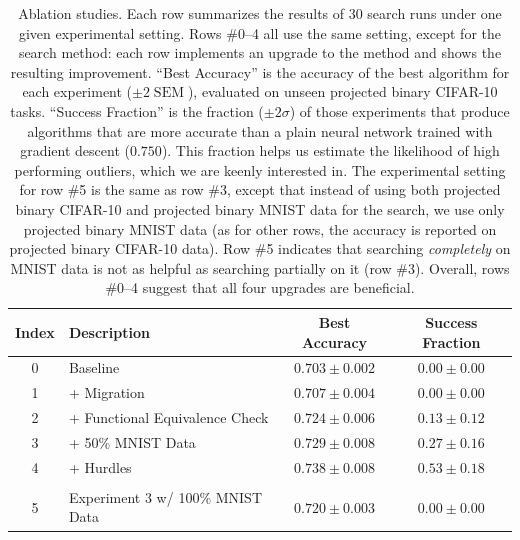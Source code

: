 {\begin{table}[!ht]
\caption{Ablation studies. Each row summarizes the results of 30 search runs under one given experimental setting. Rows \#0--4 all use the same setting, except for the search method: each row implements an upgrade to the method and shows the resulting improvement. ``Best Accuracy'' is the accuracy of the best algorithm for each experiment ($\pm 2\operatorname{SEM}$), evaluated on unseen projected binary CIFAR-10 tasks. ``Success Fraction'' is the fraction ($\pm 2\sigma$) of those experiments that produce algorithms that are more accurate than a plain neural network trained with gradient descent ($0.750$). This fraction helps us estimate the likelihood of high performing outliers, which we are keenly interested in. The experimental setting for row \#5 is the same as row \#3, except that instead of using both projected binary CIFAR-10 and projected binary MNIST data for the search, we use only projected binary MNIST data (as for other rows, the accuracy is reported on projected binary CIFAR-10 data). Row \#5 indicates that searching \emph{completely} on MNIST data is not as helpful as searching partially on it (row \#3). Overall, rows \#0--4 suggest that all four upgrades are beneficial.}
\label{methods_ablation_large_compute_table}
\begin{center}
\begin{small}
\begin{sc}
\begin{tabular}{clcc}
\toprule
Index & Description & Best Accuracy & Success Fraction \\
\midrule
0 & Baseline & $0.703 \pm 0.002$ & $0.00 \pm 0.00$  \\
1 & + Migration & $0.707 \pm 0.004$ & $0.00 \pm 0.00$ \\
2 & + Functional Equivalence Check & $0.724 \pm 0.006$ & $0.13 \pm 0.12$ \\
3 & + 50\% MNIST Data & $0.729 \pm 0.008$ & $0.27 \pm 0.16$  \\
4 & + Hurdles & $0.738 \pm 0.008$ & $0.53 \pm 0.18$ \\
\\
5 & Experiment 3 w/ 100\% MNIST Data & $0.720 \pm 0.003$ & $0.00 \pm 0.00$ \\
\bottomrule
\end{tabular}
\end{sc}
\end{small}
\end{center}
\end{table}

}
